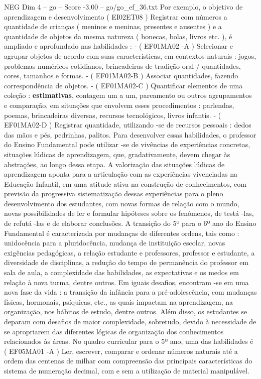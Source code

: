 \begin{textsample}{NEG Dim 4 – go – Score -3.00 – go/go\_ef\_36.txt}
Por exemplo, o objetivo de aprendizagem e desenvolvimento ( EI02ET08 ) Registrar com números a quantidade de crianças ( meninos e meninas, presentes e ausentes ) e a quantidade de objetos da mesma natureza ( bonecas, bolas, livros etc. ), é ampliado e aprofundado nas habilidades : - ( EF01MA02 -A ) Selecionar e agrupar objetos de acordo com suas características, em contextos naturais : jogos, problemas numéricos cotidianos, brincadeiras de tradição oral / quantidades, cores, tamanhos e formas. - ( EF01MA02-B ) Associar quantidades, fazendo correspondência de objetos. - ( EF01MA02-C ) Quantificar elementos de uma coleção : \textbf{estimativas}, contagem um a um, pareamento ou outros agrupamentos e comparação, em situações que envolvem esses procedimentos : parlendas, poemas, brincadeiras diversas, recursos tecnológicos, livros infantis. - ( EF01MA02-D ) Registrar quantidade, utilizando -se de recursos pessoais : dedos das mãos e pés, pedrinhas, palitos.
Para desenvolver essas habilidades, o professor do Ensino Fundamental pode utilizar -se de vivências de experiências concretas, situações lúdicas de aprendizagem, que, gradativamente, devem chegar às abstrações, ao longo dessa etapa.
A valorização das situações lúdicas de aprendizagem aponta para a articulação com as experiências vivenciadas na Educação Infantil, em uma atitude ativa na construção de conhecimentos, com previsão da progressiva sistematização dessas experiências para o pleno desenvolvimento dos estudantes, com novas formas de relação com o mundo, novas possibilidades de ler e formular hipóteses sobre os fenômenos, de testá -las, de refutá -las e de elaborar conclusões.
A transição do 5º para o 6º ano do Ensino Fundamental é caracterizada por mudanças de diferentes ordens, tais como : unidocência para a pluridocência, mudança de instituição escolar, novas exigências pedagógicas, a relação estudante e professores, professor e estudante, a diversidade de disciplinas, a redução do tempo de permanência do professor em sala de aula, a complexidade das habilidades, as expectativas e os medos em relação à nova turma, dentre outros.
Em iguais desafios, encontram -se em uma nova fase da vida : a transição da infância para a pré-adolescência, com mudanças físicas, hormonais, psíquicas, etc., as quais impactam na aprendizagem, na organização, nos hábitos de estudo, dentre outros.
Além disso, os estudantes se deparam com desafios de maior complexidade, sobretudo, devido à necessidade de se apropriarem das diferentes lógicas de organização dos conhecimentos relacionados às áreas.
No quadro curricular para o 5º ano, uma das habilidades é ( EF05MA01 -A ) Ler, escrever, comparar e ordenar números naturais até a ordem das centenas de milhar com compreensão das principais características do sistema de numeração decimal, com e sem a utilização de material manipulável.

\end{textsample}
